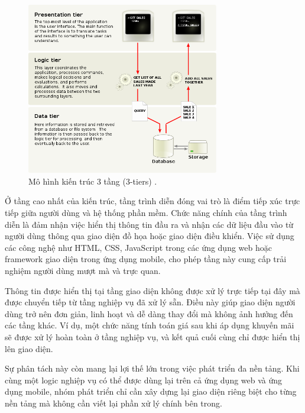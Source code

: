 \begin{figure}[H]
  \centering
  \includegraphics[width=0.75\textwidth]{images/layer.png}
  \caption{Mô hình kiến trúc 3 tầng (3-tiers) \cite{vneconomyNokia}.}
  \label{fig:15}
\end{figure}
  
  \begin{flushleft}
  \hspace*{0.8cm}Ở tầng cao nhất của kiến trúc, tầng trình diễn đóng vai trò là điểm tiếp xúc trực tiếp giữa người dùng và hệ thống phần mềm. Chức năng chính của tầng trình diễn là đảm nhận việc hiển thị thông tin đầu ra và nhận các dữ liệu đầu vào từ người dùng thông qua giao diện đồ họa hoặc giao diện điều khiển. Việc sử dụng các công nghệ như HTML, CSS, JavaScript trong các ứng dụng web hoặc framework giao diện trong ứng dụng mobile, cho phép tầng này cung cấp trải nghiệm người dùng mượt mà và trực quan.
  \end{flushleft}
  
  \begin{flushleft}
  \hspace*{0.8cm}Thông tin được hiển thị tại tầng giao diện không được xử lý trực tiếp tại đây mà được chuyển tiếp từ tầng nghiệp vụ đã xử lý sẵn. Điều này giúp giao diện người dùng trở nên đơn giản, linh hoạt và dễ dàng thay đổi mà không ảnh hưởng đến các tầng khác. Ví dụ, một chức năng tính toán giá sau khi áp dụng khuyến mãi sẽ được xử lý hoàn toàn ở tầng nghiệp vụ, và kết quả cuối cùng chỉ được hiển thị lên giao diện.
  \end{flushleft}
  
  \begin{flushleft}
  \hspace*{0.8cm}Sự phân tách này còn mang lại lợi thế lớn trong việc phát triển đa nền tảng. Khi cùng một logic nghiệp vụ có thể được dùng lại trên cả ứng dụng web và ứng dụng mobile, nhóm phát triển chỉ cần xây dựng lại giao diện riêng biệt cho từng nền tảng mà không cần viết lại phần xử lý chính bên trong.
  \end{flushleft}
  
